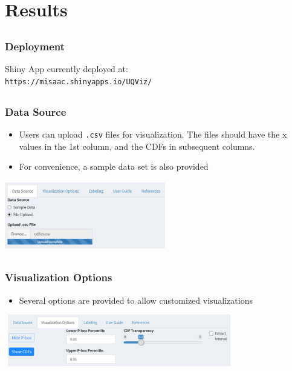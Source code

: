 \documentclass[handout, xcolor=dvipsnames]{beamer}
\begin{document}
\section{Results}  

\subsection{}
\begin{frame}
	\frametitle{Deployment}
	\begin{center} 
		Shiny App currently deployed at: \\ {\tt https://misaac.shinyapps.io/UQViz/}
	\end{center}
\end{frame}

\subsection{}
\begin{frame}
	\frametitle{Data Source}
	\begin{itemize}
	\item Users can upload {\tt .csv} files for visualization. The files should have the x values in the 1st column, and the CDFs in subsequent columns. 
	\item For convenience, a sample data set is also provided
	\end{itemize}
	\begin{center} 
		\includegraphics[height=3cm,width=7cm]{figures/tab_ds.png}
	\end{center}
\end{frame}

\subsection{}
\begin{frame}
	\frametitle{Visualization Options}
	\begin{itemize}
	\item Several options are provided to allow customized visualizations 
	\end{itemize}
	\begin{center} 
		\includegraphics[height=2.25cm,width=10cm]{figures/tab_vo.png}
	\end{center}
\end{frame}
\end{document}
